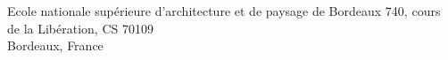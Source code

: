 \recipient
  {Ecole nationale supérieure d'architecture et de paysage de Bordeaux}
  {740, cours de la Libération, CS 70109\\Bordeaux, France}

